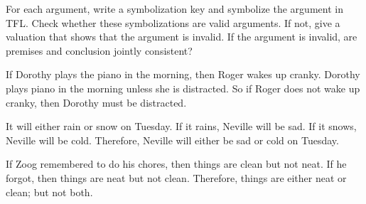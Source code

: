 \begin{practiceproblems}
\problempart
For each argument, write a symbolization key and symbolize the argument in TFL. Check whether these symbolizations are valid arguments. If not, give a valuation that shows that the argument is invalid. If the argument is invalid, are premises and conclusion jointly consistent?
\begin{problemslist}
\item If Dorothy plays the piano in the morning, then Roger wakes up cranky. Dorothy plays piano in the morning unless she is distracted. So if Roger does not wake up cranky, then Dorothy must be distracted.
\item It will either rain or snow on Tuesday. If it rains, Neville will be sad. If it snows, Neville will be cold. Therefore, Neville will either be sad or cold on Tuesday.
\item If Zoog remembered to do his chores, then things are clean but not neat. If he forgot, then things are neat but not clean. Therefore, things are either neat or clean; but not both.
\end{problemslist}


\end{practiceproblems}
